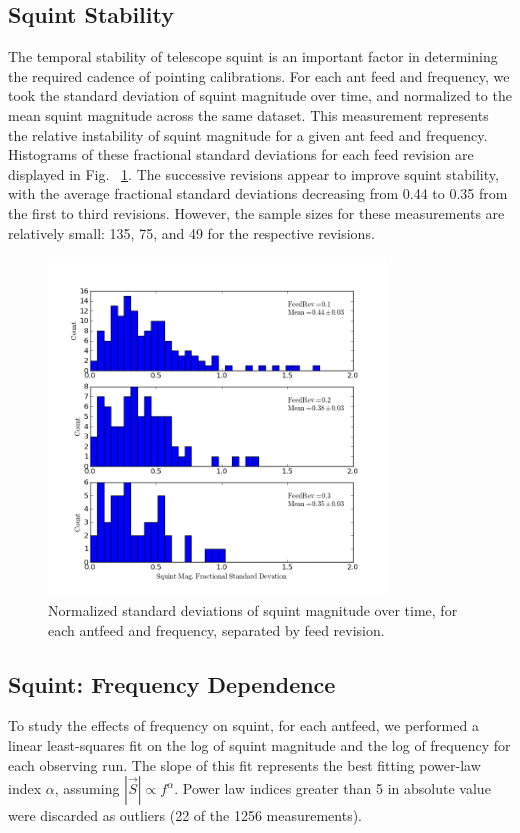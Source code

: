 \documentclass[preprint]{aastex}
\begin{document}
\subsection{Squint Stability}\label{ss.temporal}
The temporal stability of telescope squint is an important factor in 
determining the required cadence of pointing calibrations.  For each ant 
feed and frequency, we took the standard deviation of squint magnitude 
over time, and normalized to the mean squint magnitude across the same 
dataset.  This measurement represents the relative instability of squint 
magnitude for a given ant feed and frequency.  Histograms of these 
fractional standard deviations for each feed revision are displayed in Fig.~
\ref{fig.squint_time}.  The successive revisions appear to improve squint 
stability, with the average fractional standard deviations decreasing from 
0.44 to 0.35 from the first to third revisions.  However, the sample sizes for 
these measurements are relatively small: 135, 75, and 49 for the respective 
revisions.  

\begin{figure}[htb]
\begin{center}
\includegraphics[width=0.8\textwidth]{images/squinttime_rev}
\caption{Normalized standard deviations of squint magnitude over time,
  for each antfeed and frequency, separated by feed
  revision. \label{fig.squint_time}}
\end{center}
\end{figure}

\subsection{Squint: Frequency Dependence}\label{ss.freq}
To study the effects of frequency on squint, for each antfeed, we
performed a linear least-squares fit on the log of squint magnitude
and the log of frequency for each observing run.  The slope of this
fit represents the best fitting power-law index $\alpha$, assuming
$|\vec{S}| \propto f^\alpha$.  Power law indices greater than 5 in absolute 
value were discarded as outliers (22 of the 1256 measurements).
\end{document}

